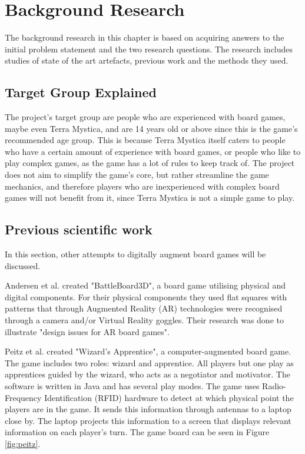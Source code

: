 \chapter{Background Research}\label{ch:bgres}

The background research in this chapter is based on acquiring answers to the initial problem statement and the two research questions. The research includes studies of state of the art artefacts, previous work and the methods they used. 


\section{Target Group Explained}\label{sec:TargetGroup}
The project's target group are people who are experienced with board games, maybe even Terra Mystica, and are 14 years old or above since this is the game's recommended age group. This is because Terra Mystica itself caters to people who have a certain amount of experience with board games, or people who like to play complex games, as the game has a lot of rules to keep track of. The project does not aim to simplify the game's core, but rather streamline the game mechanics, and therefore players who are inexperienced with complex board games will not benefit from it, since Terra Mystica is not a simple game to play.

\section{Previous scientific work}
In this section, other attempts to digitally augment board games will be discussed.

Andersen et al. \citep{andersen_designing_2004} created "BattleBoard3D", a board game utilising physical and digital components. For their physical components they used flat squares with patterns that through Augmented Reality (AR) technologies were recognised through a camera and/or Virtual Reality goggles. Their research was done to illustrate "design issues for AR board games".

Peitz et al. \citep{peitzWizards2006} created "Wizard's Apprentice", a computer-augmented board game. The game includes two roles: wizard and apprentice. All players but one play as apprentices guided by the wizard, who acts as a negotiator and motivator. The software is written in Java and has several play modes. The game uses Radio-Frequency Identification (RFID) hardware to detect at which physical point the players are in the game. It sends this information through antennas to a laptop close by. The laptop projects this information to a screen that displays relevant information on each player's turn. The game board can be seen in Figure \ref{fig:peitz}.

